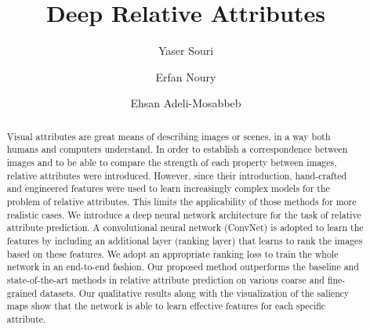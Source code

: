 \documentclass[runningheads]{llncs}
\begin{document}
\newcommand{\point}{
    \raise0.7ex\hbox{.}
    }


\pagestyle{headings}

\mainmatter

\title{Deep Relative Attributes} %



\author{Yaser Souri} %

\author{Erfan Noury}

\author{Ehsan Adeli-Mosabbeb}

\maketitle

\begin{abstract}
Visual attributes are great means of describing images or scenes, in a way both humans and computers understand. In order to establish a correspondence between images and to be able to compare the strength of each property between images, relative attributes were introduced. However, since their introduction, hand-crafted and engineered features were used to learn increasingly complex models for the problem of relative attributes. This limits the applicability of those methods for more realistic cases. We introduce a deep neural network architecture for the task of relative attribute prediction. A convolutional neural network (ConvNet) is adopted to learn the features by including an additional layer (ranking layer) that learns to rank the images based on these features. We adopt an appropriate ranking loss to train the whole network in an end-to-end fashion. Our proposed method outperforms the baseline and state-of-the-art methods in relative attribute prediction on various coarse and fine-grained datasets. Our qualitative results along with the visualization of the saliency maps show that the network is able to learn effective features for each specific attribute.
\end{abstract}
\end{document}

